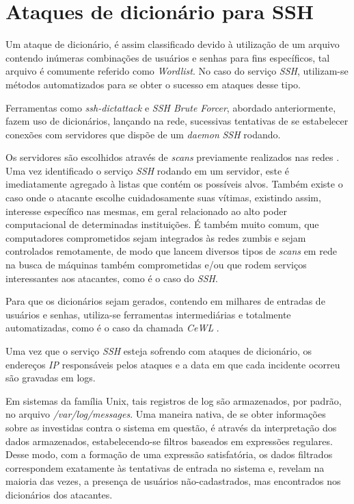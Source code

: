 \section{Ataques de dicionário para SSH}

Um ataque de dicionário, é assim classificado devido à utilização de um arquivo contendo inúmeras combinações de usuários e senhas para fins específicos, tal arquivo é comumente referido como \textit{Wordlist}. No caso do serviço \textit{SSH}, utilizam-se métodos automatizados para se obter o sucesso em ataques desse tipo.

Ferramentas como \textit{ssh-dictattack} \cite{SSHDictAttack} e \textit{SSH Brute Forcer}, abordado anteriormente, fazem uso de dicionários, lançando na rede, sucessivas tentativas de se estabelecer conexões com servidores que dispõe de um \textit{daemon} \textit{SSH} rodando.

Os servidores são escolhidos através de \textit{scans} previamente realizados nas redes \cite{NetworkBasedDictionaryAttackDetection}. Uma vez identificado o serviço \textit{SSH} rodando em um servidor, este é imediatamente agregado à listas que contém os possíveis alvos. Também existe o caso onde o atacante escolhe cuidadosamente suas vítimas, existindo assim, interesse específico nas mesmas, em geral relacionado ao alto poder computacional de determinadas instituições. É também muito comum, que computadores comprometidos sejam integrados às redes zumbis e sejam controlados remotamente, de modo que lancem diversos tipos de \textit{scans} em rede na busca de máquinas também comprometidas e/ou que rodem serviços interessantes aos atacantes, como é o caso do \textit{SSH}.

Para que os dicionários sejam gerados, contendo em milhares de entradas de usuários e senhas, utiliza-se ferramentas intermediárias e totalmente automatizadas, como é o caso da chamada \textit{CeWL} \cite{CeWL}.

Uma vez que o serviço \textit{SSH} esteja sofrendo com ataques de dicionário, os endereços \textit{IP} responsáveis pelos ataques e a data em que cada incidente ocorreu são gravadas em logs.

Em sistemas da família Unix, tais registros de log são armazenados, por padrão, no arquivo \textit{/var/log/messages}. Uma maneira nativa, de se obter informações sobre as investidas contra o sistema em questão, é através da interpretação dos dados armazenados, estabelecendo-se filtros baseados em expressões regulares. Desse modo, com a formação de uma expressão satisfatória, os dados filtrados correspondem exatamente às tentativas de entrada no sistema e, revelam na maioria das vezes, a presença de usuários não-cadastrados, mas encontrados nos dicionários dos atacantes.

